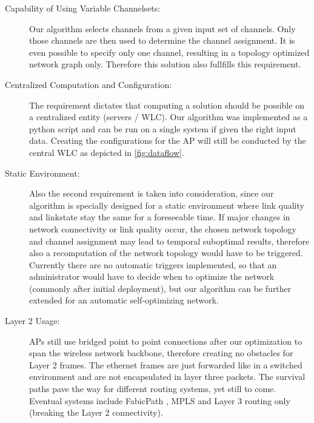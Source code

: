 \begin{description}
	\item[Capability of Using Variable Channelsets:]
	  Our algorithm selects channels from a given input set of channels. Only those channels are then used to determine the channel assignment.
	  It is even possible to specify only one channel, resulting in a topology optimized network graph only.
	  Therefore this solution also fullfills this requirement.  
	  
	\item[Centralized Computation and Configuration:]
	  The requirement dictates that computing a solution should be possible on a centralized entity (servers / \ac{WLC}).
	  Our algorithm was implemented as a python script and can be run on a single system if given the right input data.
	  Creating the configurations for the \ac{AP} will still be conducted by the central WLC as depicted in \ref{fig:dataflow}.
	  
	\item[Static Environment:]
	  Also the second requirement is taken into consideration, since our algorithm is specially designed for a static environment where link quality 
	  and linkstate stay the same for a foreseeable time.
	  If major changes in network connectivity or link quality occur, the chosen network topology and channel assignment
	  may lead to temporal suboptimal results, therefore also a recomputation of the network topology would have to be triggered.
	  Currently there are no automatic triggers implemented, so that an administrator would have to decide when to optimize the network (commonly after initial deployment),
	  but our algorithm can be further extended for an automatic self-optimizing network.
	  
	\item[Layer 2 Usage:]
	  APs still use bridged point to point connections after our optimization to span the wireless network backbone, therefore creating no obstacles for Layer 2 frames.
	  The ethernet frames are just forwarded like in a switched environment and are not encapsulated in layer three packets.
	  The survival paths pave the way for different routing systems, yet still to come. Eventual systems include FabicPath \cite{fabricpath}, \ac{MPLS} \cite{mpls} and 
	  Layer 3 routing only (breaking the Layer 2 connectivity).
	  

\end{description}
